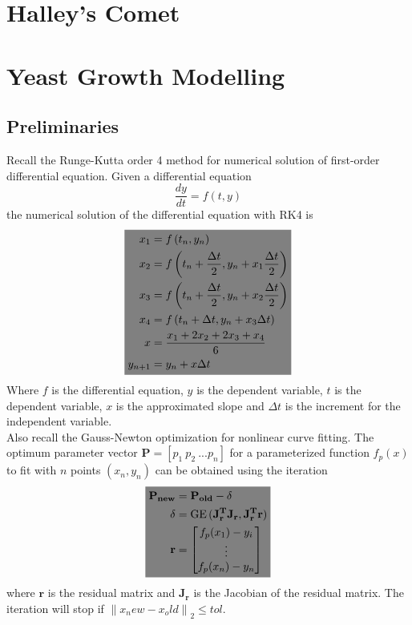 \documentclass[10pt, twocolumn]{article}
\newcommand{\highlight}[1]{\colorbox{gray}{$\displaystyle#1$}}
\DeclareMathOperator{\GE}{GE}
\begin{document}
	\section{Halley's Comet}
	\section{Yeast Growth Modelling}
	\subsection{Preliminaries}
	Recall the Runge-Kutta order 4 method for numerical solution of first-order differential equation. Given a differential equation
	$$\frac{dy}{dt} = f(t, y)
	$$
	the numerical solution of the differential equation with RK4 is
	\begin{equation}
	\highlight{
		\begin{aligned}
			x_1 &= f\left(t_n, y_n\right)\\
			x_2 &= f\left(t_n + \frac{\Delta t}{2}, y_n + x_1 \frac{\Delta t}{2}\right)\\
			x_3 &= f\left(t_n + \frac{\Delta t}{2}, y_n + x_2 \frac{\Delta t}{2}\right)\\
			x_4 &= f\left(t_n + \Delta t, y_n + x_3 \Delta t\right)\\
			x &= \frac{x_1+2x_2+2x_3+x_4}{6}\\
			y_{n+1} &= y_n + x\Delta t
		\end{aligned}
	}
	\end{equation}
	Where $f$ is the differential equation, $y$ is the dependent variable, $t$ is the dependent variable, $x$ is the approximated slope and $\Delta t$ is the increment for the independent variable.\\
	Also recall the Gauss-Newton optimization for nonlinear curve fitting. 
	The optimum parameter vector $\mathbf{P}=[p_1\:p_2\:...p_n]$ for a parameterized function $f_p(x)$ to fit with $n$ points $(x_n, y_n)$ can be obtained using the iteration
	\begin{equation}
	\highlight{
		\begin{aligned}
			\mathbf{P_{new}} &= \mathbf{P_{old}} - \delta\\
			\delta &= \GE\mathbf{(J_r^TJ_r, J_r^Tr)}\\
			\mathbf{r} &= 
				\begin{bmatrix}
					f_p(x_1)-y_i\\
					\vdots\\
					f_p(x_n)-y_n\\
				\end{bmatrix}
		\end{aligned}
	}
	\end{equation}
	where $\mathbf{r}$ is the residual matrix and $\mathbf{J_r}$ is the Jacobian of the residual matrix.
	The iteration will stop if $\left\|x_new - x_old\right\|_2 \leq tol$.
	
\end{document}
